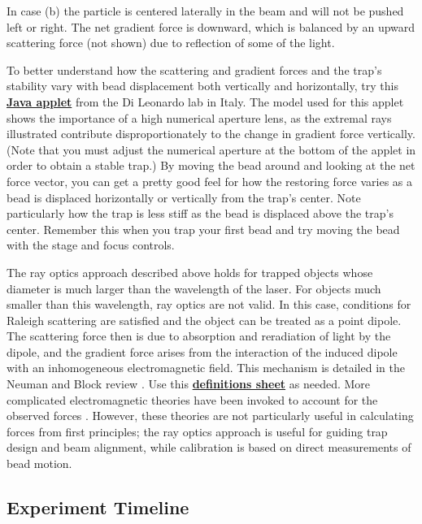 \documentclass{../lab}
\begin{document}
\newpage

In case (b) the particle is centered laterally in the beam and will not be pushed left or right. The net gradient force is downward, which is balanced by an upward scattering force (not shown) due to reflection of some of the light.

To better understand how the scattering and gradient forces and the trap's stability vary with bead displacement both vertically and horizontally, try this \href{http://glass.phys.uniroma1.it/dileonardo/content/apps/trapforces.php}{\textbf{Java applet}} from the Di Leonardo lab \cite{Leonardo} in Italy. The model used for this applet shows the importance of a high numerical aperture lens, as the extremal rays illustrated contribute disproportionately to the change in gradient force vertically. (Note that you must adjust the numerical aperture at the bottom of the applet in order to obtain a stable trap.) By moving the bead around and looking at the net force vector, you can get a pretty good feel for how the restoring force varies as a bead is displaced horizontally or vertically from the trap's center. Note particularly how the trap is less stiff as the bead is displaced above the trap's center. Remember this when you trap your first bead and try moving the bead with the stage and focus controls.

The ray optics approach described above holds for trapped objects whose diameter is much larger than the wavelength of the laser. For objects much smaller than this wavelength, ray optics are not valid. In this case, conditions for Raleigh scattering are satisfied and the object can be treated as a point dipole. The scattering force then is due to absorption and reradiation of light by the dipole, and the gradient force arises from the interaction of the induced dipole with an inhomogeneous electromagnetic field. This mechanism is detailed in the Neuman and Block review \cite{Neuman}. Use this \href{http://physics111.lib.berkeley.edu/Physics111/Reprints/OTZ/biowikipedia.pdf}{\textbf{definitions sheet}} as needed. More complicated electromagnetic theories have been invoked to account for the observed forces \cite{Neuman,Bechhoefer,Shaevitz}. However, these theories are not particularly useful in calculating forces from first principles; the ray optics approach is useful for guiding trap design and beam alignment, while calibration is based on direct measurements of bead motion.

\subsection{Experiment Timeline}
\end{document}

